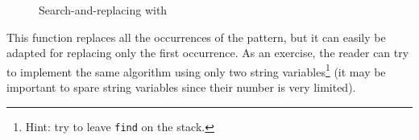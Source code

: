 \begin{figure}[!htbp]
\begin{myexv}
\end{myexv} %
\caption{Search-and-replacing with \bt}\label{fig5}
\end{figure}

This function replaces all the occurrences of the pattern, but it can easily be
adapted for replacing only the first occurrence. As an exercise, the reader can
try to implement the same algorithm using only two string
variables\footnote{Hint: try to leave \texttt{find} on the stack.} (it may be
important to spare string variables since their number is very limited).
